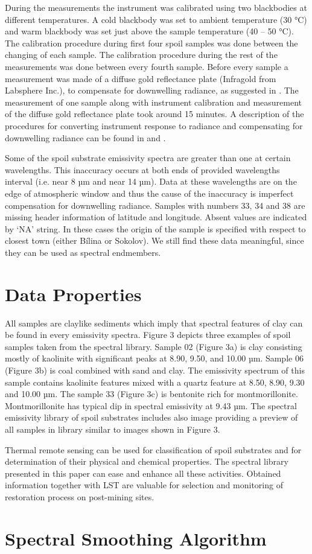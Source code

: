During the measurements the instrument was calibrated using two blackbodies at different temperatures. A cold blackbody was set to ambient temperature (30 °C) and warm blackbody was set just above the sample temperature (40 – 50 °C). The calibration procedure during first four spoil samples was done between the changing of each sample. The calibration procedure during the rest of the measurements was done between every fourth sample. Before every sample a measurement was made of a diffuse gold reflectance plate (Infragold from Labsphere Inc.), to compensate for downwelling radiance, as suggested in \cite{GV13}. The measurement of one sample along with instrument calibration and measurement of the diffuse gold reflectance plate took around 15 minutes. A description of the procedures for converting instrument response to radiance and compensating for downwelling radiance can be found in \cite{HJ98} and \cite{HK96}.

Some of the spoil substrate emissivity spectra are greater than one at certain wavelengths. This inaccuracy occurs at both ends of provided wavelengths interval (i.e. near 8 µm and near 14 µm). Data at these wavelengths are on the edge of atmospheric window and thus the cause of the inaccuracy is imperfect compensation for downwelling radiance. Samples with numbers 33, 34 and 38 are missing header information of latitude and longitude. Absent values are indicated by ‘NA’ string. In these cases the origin of the sample is specified with respect to closest town (either Bílina or Sokolov). We still find these data meaningful, since they can be used as spectral endmembers.


\section{Data Properties}

All samples are claylike sediments which imply that spectral features of clay can be found in every emissivity spectra. Figure 3 depicts three examples of spoil samples taken from the spectral library. Sample 02 (Figure 3a) is clay consisting mostly of kaolinite with significant peaks at 8.90, 9.50, and 10.00 µm. Sample 06 (Figure 3b) is coal combined with sand and clay. The emissivity spectrum of this sample contains kaolinite features mixed with a quartz feature at 8.50, 8.90, 9.30 and 10.00 µm. The sample 33 (Figure 3c) is bentonite rich for montmorillonite. Montmorillonite has typical dip in spectral emissivity at 9.43 µm. The spectral emissivity library of spoil substrates includes also image providing a preview of all samples in library similar to images shown in Figure 3.

Thermal remote sensing can be used for classification of spoil substrates and for determination of their physical and chemical properties. The spectral library presented in this paper can ease and enhance all these activities. Obtained information together with LST are valuable for selection and monitoring of restoration process on post-mining sites.

\section{Spectral Smoothing Algorithm}



